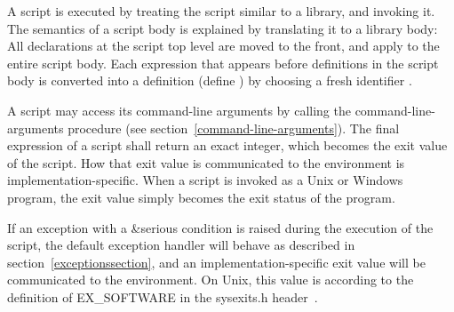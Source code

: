 A script is executed by treating the script similar to a library, and
invoking it.  The semantics of a script body is explained by
translating it to a library body: All declarations at the script top
level are moved to the front, and apply to the entire script body.
Each expression  that appears before definitions in
the script body is converted into a definition {\cf (define 
  )} by choosing a fresh identifier .

A script may access its command-line arguments by calling the {\cf
  command-line-arguments} procedure (see
section~\ref{command-line-arguments}).  The final expression of a
script shall return an exact integer, which becomes the exit value of
the script.  How that exit value is communicated to the environment is
implementation-specific.  When a script is invoked as a Unix or
Windows program, the exit value simply becomes the exit status of the
program.

If an exception with a {\cf\&serious} condition is raised during the
execution of the script, the default exception handler will behave as
described in section~\ref{exceptionssection}, and an
implementation-specific exit value will be communicated to the
environment.  On Unix, this value is according to the definition of
{\cf EX\_SOFTWARE} in the {\cf sysexits.h} header~\cite{srfi22}.

